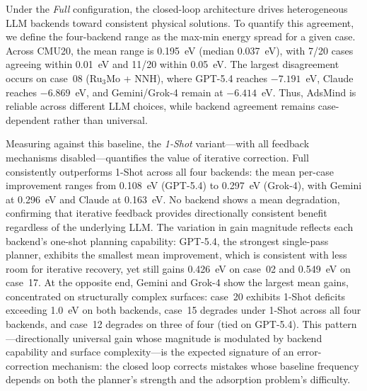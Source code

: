 Under the \textit{Full} configuration, the closed-loop architecture drives heterogeneous LLM backends toward consistent physical solutions.
To quantify this agreement, we define the four-backend range as the max-min energy spread for a given case.
Across CMU20, the mean range is 0.195~eV (median 0.037~eV), with 7/20 cases agreeing within 0.01~eV and 11/20 within 0.05~eV.
The largest disagreement occurs on case~08 (Ru$_3$Mo + NNH), where GPT-5.4 reaches $-7.191$~eV, Claude reaches $-6.869$~eV, and Gemini/Grok-4 remain at $-6.414$~eV.
Thus, AdsMind is reliable across different LLM choices, while backend agreement remains case-dependent rather than universal.

Measuring against this baseline, the \textit{1-Shot} variant---with all feedback mechanisms disabled---quantifies the value of iterative correction.
Full consistently outperforms 1-Shot across all four backends: the mean per-case improvement ranges from 0.108~eV (GPT-5.4) to 0.297~eV (Grok-4), with Gemini at 0.296~eV and Claude at 0.163~eV.
No backend shows a mean degradation, confirming that iterative feedback provides directionally consistent benefit regardless of the underlying LLM.
The variation in gain magnitude reflects each backend's one-shot planning capability: GPT-5.4, the strongest single-pass planner, exhibits the smallest mean improvement, which is consistent with less room for iterative recovery, yet still gains 0.426~eV on case~02 and 0.549~eV on case~17.
At the opposite end, Gemini and Grok-4 show the largest mean gains, concentrated on structurally complex surfaces: case~20 exhibits 1-Shot deficits exceeding 1.0~eV on both backends, case~15 degrades under 1-Shot across all four backends, and case~12 degrades on three of four (tied on GPT-5.4).
This pattern---directionally universal gain whose magnitude is modulated by backend capability and surface complexity---is the expected signature of an error-correction mechanism: the closed loop corrects mistakes whose baseline frequency depends on both the planner's strength and the adsorption problem's difficulty.

